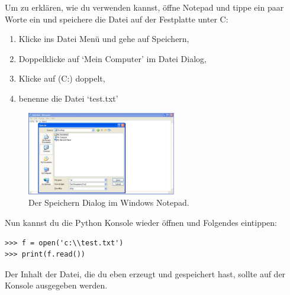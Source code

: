 \begin{WINDOWS}
Um zu erklären, wie du  verwenden kannst, öffne Notepad und tippe ein paar Worte ein und speichere die Datei auf der Festplatte unter C:

\begin{enumerate}
 \item Klicke ins Datei Menü und gehe auf Speichern,
 \item Doppelklicke auf `Mein Computer' im Datei Dialog,
 \item Klicke auf (C:) doppelt,
 \item benenne die Datei `test.txt'
\end{enumerate}

\begin{figure}
\begin{center}
\includegraphics[width=65mm]{images/figure17}
\end{center}
\caption{Der Speichern Dialog im Windows Notepad.}\label{fig17}
\end{figure}

Nun kannst du die Python Konsole wieder öffnen und Folgendes eintippen:

\begin{Verbatim}[frame=single]
>>> f = open('c:\\test.txt')
>>> print(f.read())
\end{Verbatim}

Der Inhalt der Datei, die du eben erzeugt und gespeichert hast, sollte auf der Konsole ausgegeben werden. %
\end{WINDOWS}

